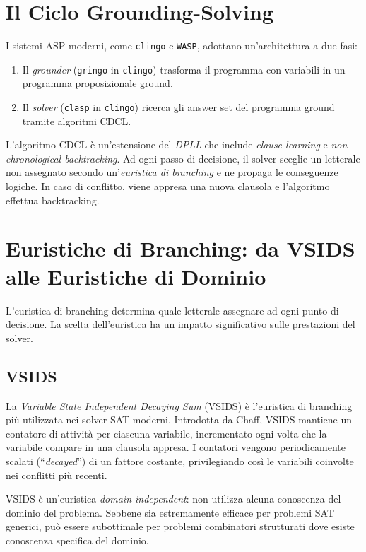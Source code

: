 \documentclass[a4paper,12pt,twoside,openright]{report}
\newcommand{\clingo}{\texttt{clingo}}
\newcommand{\wasp}{\texttt{WASP}}
\newcommand{\cdcl}{\textsc{CDCL}}
\newcommand{\vsids}{\textsc{VSIDS}}
\begin{document}
\section{Il Ciclo Grounding-Solving}

I sistemi ASP moderni, come \clingo{} e \wasp{}, adottano un'architettura a due fasi:
\begin{enumerate}
    \item Il \emph{grounder} (\texttt{gringo} in \clingo{}) trasforma il programma con variabili in un programma proposizionale ground.
    \item Il \emph{solver} (\texttt{clasp} in \clingo{}) ricerca gli answer set del programma ground tramite algoritmi \cdcl{}.
\end{enumerate}

L'algoritmo \cdcl{} \`{e} un'estensione del \emph{DPLL} che include \emph{clause learning} e \emph{non-chronological backtracking}. Ad ogni passo di decisione, il solver sceglie un letterale non assegnato secondo un'\emph{euristica di branching} e ne propaga le conseguenze logiche. In caso di conflitto, viene appresa una nuova clausola e l'algoritmo effettua backtracking.

\section{Euristiche di Branching: da VSIDS alle Euristiche di Dominio}
\label{sec:vsids}

L'euristica di branching determina quale letterale assegnare ad ogni punto di decisione. La scelta dell'euristica ha un impatto significativo sulle prestazioni del solver.

\subsection{VSIDS}

La \emph{Variable State Independent Decaying Sum} (\vsids{}) \`{e} l'euristica di branching pi\`{u} utilizzata nei solver SAT moderni. Introdotta da Chaff, \vsids{} mantiene un contatore di attivit\`{a} per ciascuna variabile, incrementato ogni volta che la variabile compare in una clausola appresa. I contatori vengono periodicamente scalati (``\emph{decayed}'') di un fattore costante, privilegiando cos\`{i} le variabili coinvolte nei conflitti pi\`{u} recenti.

\vsids{} \`{e} un'euristica \emph{domain-independent}: non utilizza alcuna conoscenza del dominio del problema. Sebbene sia estremamente efficace per problemi SAT generici, pu\`{o} essere subottimale per problemi combinatori strutturati dove esiste conoscenza specifica del dominio.
\end{document}
